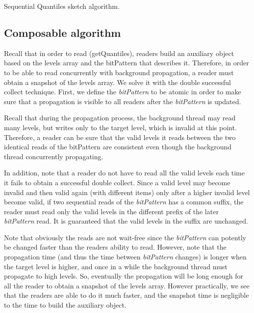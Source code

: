 \begin{algorithm}[htb]
\begin{algorithmic}[1]
\end{algorithmic}
\caption{Sequential Quantiles sketch algorithm.}
\label{alg:sequential-quantiles}
\end{algorithm}

\subsection{Composable algorithm}

Recall that in order to read (getQuantiles), readers build an
auxiliary object based on the levels array and the bitPattern
that describes it.
Therefore, in order to be able to read concurrently with
background propagation, a reader must obtain a snapshot of the
levels array.
We solve it with the double successful collect technique.
First, we define the \emph{bitPattern} to be atomic in order to make sure
that a propagation is visible to all readers after the
\emph{bitPattern} is updated.

Recall that during the propagation process, the background
thread may read many levels, but writes only to the target level,
which is invalid at this point.
Therefore, a reader can be sure that the valid levels it reads
between the two identical reads of the bitPattern are consistent
even though the background thread concurrently
propagating.

In addition, note that a reader do not have to read all the valid
levels each time it fails to obtain a successful double collect.
Since a valid level may become invalid and then valid again
(with different items) only after a higher invalid level become
valid, if two sequential reads of the \emph{bitPattern} has a
common suffix, the reader must read only the valid levels in
the different prefix of the later \emph{bitPattern} read. 
It is guaranteed that the valid levels in the suffix are
unchanged.

Note that obviously the reads are not wait-free since the
\emph{bitPattern} can potently be changed faster than the readers ability
to read.
However, note that the propagation time (and thus
the time between \emph{bitPattern} changes) is longer when the target
level is higher, and once in a while the background thread must
propagate to high levels.
So, eventually the propagation will be long enough for
all the reader to obtain a snapshot of the levels array. 
However practically, we see that the readers are able to do it
much faster, and the snapshot time is negligible to the time to
build the auxiliary object.

